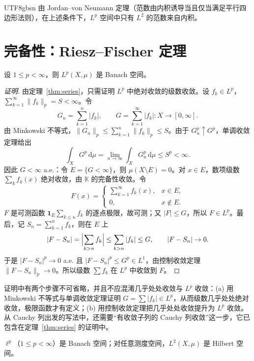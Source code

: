 \documentclass[11pt]{article}
\newcommand{\K}{\mathbb{K}}
\newcommand{\norm}[1]{\lVert #1\rVert}
\newcommand{\dmu}{\,\mathrm{d}\mu}
\newcommand{\ind}{\mathbf{1}}
\begin{document}
\begin{CJK*}{UTF8}{gbsn}
由 Jordan--von Neumann 定理（范数由内积诱导当且仅当满足平行四边形法则），在上述条件下，$L^{p}$ 空间中只有 $L^{2}$ 的范数来自内积。

\section{完备性：Riesz--Fischer 定理}

\begin{theorem}\label{thm:riesz-fischer}
设 $1\le p<\infty$，则 $L^{p}(X,\mu)$ 是 Banach 空间。
\end{theorem}

\begin{proof}[证明]
由定理~\ref{thm:series}，只需证明 $L^{p}$ 中绝对收敛的级数收敛。设 $f_{k}\in L^{p}$，$\sum_{k=1}^{\infty}\norm{f_{k}}_{p}=S<\infty$。令
\[
G_{n}=\sum_{k=1}^{n}|f_{k}|,\qquad G=\sum_{k=1}^{\infty}|f_{k}|:X\to[0,\infty].
\]
由 Minkowski 不等式，$\norm{G_{n}}_{p}\le\sum_{k=1}^{n}\norm{f_{k}}_{p}\le S$。由于 $G_{n}^{p}\uparrow G^{p}$，单调收敛定理给出
\[
\int_{X}G^{p}\dmu=\lim_{n\to\infty}\int_{X}G_{n}^{p}\dmu\le S^{p}<\infty .
\]
因此 $G<\infty$ a.e.：令 $E=\{G<\infty\}$，则 $\mu(X\setminus E)=0$。对 $x\in E$，数项级数 $\sum_{k}f_{k}(x)$ 绝对收敛，由 $\K$ 的完备性收敛。令
\[
F(x)=\begin{cases}\sum_{k=1}^{\infty}f_{k}(x),&x\in E,\\ 0,&x\notin E.\end{cases}
\]
$F$ 是可测函数 $\ind_{E}\sum_{k\le n}f_{k}$ 的逐点极限，故可测；又 $|F|\le G$，所以 $F\in L^{p}$。最后，记 $S_{n}=\sum_{k=1}^{n}f_{k}$，则在 $E$ 上
\[
|F-S_{n}|=\Bigl|\sum_{k>n}f_{k}\Bigr|\le\sum_{k>n}|f_{k}|\le G,\qquad |F-S_{n}|\to0 .
\]
于是 $|F-S_{n}|^{p}\to0$ a.e. 且 $|F-S_{n}|^{p}\le G^{p}\in L^{1}$，由控制收敛定理 $\norm{F-S_{n}}_{p}\to0$。所以级数 $\sum f_{k}$ 在 $L^{p}$ 中收敛到 $F$。
\end{proof}

\begin{remark}
证明中有两个步骤不可省略，并且不应混淆几乎处处收敛与 $L^{p}$ 收敛：(a) 用 Minkowski 不等式与单调收敛定理证明 $G=\sum|f_{k}|\in L^{p}$，从而级数几乎处处绝对收敛，极限函数才有定义；(b) 用控制收敛定理把几乎处处收敛提升为 $L^{p}$ 收敛。从 Cauchy 列出发的写法中，还需要“有收敛子列的 Cauchy 列收敛”这一步，它已包含在定理~\ref{thm:series} 的证明中。
\end{remark}

\begin{corollary}
$\ell^{p}$（$1\le p<\infty$）是 Banach 空间；对任意测度空间，$L^{2}(X,\mu)$ 是 Hilbert 空间。
\end{corollary}


\end{CJK*}
\end{document}
